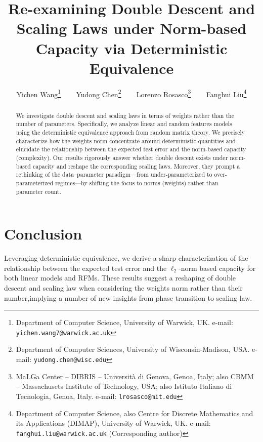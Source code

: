 \documentclass[11pt]{article}
\title{\huge Re-examining Double Descent and Scaling Laws under Norm-based Capacity via Deterministic Equivalence}
\author
{
     Yichen Wang\thanks{Department of Computer Science, University of Warwick, UK. e-mail: {\tt yichen.wang7@warwick.ac.uk}} 
     ~~~
     Yudong Chen\thanks{Department of Computer Sciences, University of Wisconsin-Madison, USA. e-mail: {\tt yudong.chen@wisc.edu}}
      ~~~
     Lorenzo Rosasco\thanks{MaLGa Center – DIBRIS – Università di Genova, Genoa, Italy; also CBMM – Massachusets Institute of Technology, USA; also Istituto Italiano di Tecnologia, Genoa, Italy. e-mail: {\tt lrosasco@mit.edu}} 
~~~
    Fanghui Liu\thanks{Department of Computer Science, also Centre for Discrete Mathematics and its Applications (DIMAP), University of Warwick, UK. e-mail: {\tt fanghui.liu@warwick.ac.uk} (Corresponding author)} 
}
\date{}
\newcommand{\disableaddcontentsline}{%
  \let\savedaddcontentsline\addcontentsline 
  \renewcommand{\addcontentsline}[3]{}
}
\begin{document}
\disableaddcontentsline




\maketitle


\begin{abstract}
We investigate double descent and scaling laws in terms of weights rather than the number of parameters. Specifically, we analyze linear and random features models using the deterministic equivalence approach from random matrix theory. We precisely characterize how the weights norm concentrate around deterministic quantities and elucidate the relationship between the expected test error and the norm-based capacity (complexity). Our results rigorously answer whether double descent exists under norm-based capacity and reshape the corresponding scaling laws. Moreover, they prompt a rethinking of the data–parameter paradigm—from under-parameterized to over-parameterized regimes—by shifting the focus to norms (weights) rather than parameter count.
\end{abstract}






\vspace{-0.cm}








\vspace{-0.cm}
\section{Conclusion}
Leveraging deterministic equivalence, we derive a sharp characterization of the relationship between the expected test error and the $\ell_2$-norm based capacity for both linear models and RFMs. 
These results suggest a reshaping of double descent and scaling law when considering the weights norm rather than their number,implying a number of new insights from phase transition to scaling law.
\end{document}
